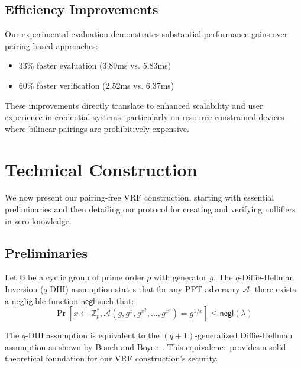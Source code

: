 \subsection{Efficiency Improvements}

Our experimental evaluation demonstrates substantial performance gains over pairing-based approaches:
\begin{itemize}
    \item 33\% faster evaluation (3.89ms vs. 5.83ms)
    \item 60\% faster verification (2.52ms vs. 6.37ms)
\end{itemize}

These improvements directly translate to enhanced scalability and user experience in credential systems, particularly on resource-constrained devices where bilinear pairings are prohibitively expensive.












\newpage
\section{Technical Construction}

We now present our pairing-free VRF construction, starting with essential preliminaries and then detailing our protocol for creating and verifying nullifiers in zero-knowledge.

\subsection{Preliminaries}

\begin{definition}
Let $\mathbb{G}$ be a cyclic group of prime order $p$ with generator $g$. The $q$-Diffie-Hellman Inversion ($q$-DHI) assumption states that for any PPT adversary $\mathcal{A}$, there exists a negligible function $\mathsf{negl}$ such that:
\[
\Pr\left[x \leftarrow \mathbb{Z}_p^*, \mathcal{A}(g, g^x, g^{x^2}, \ldots, g^{x^q}) = g^{1/x}\right] \leq \mathsf{negl}(\lambda)
\]
\end{definition}

\begin{remark}
The $q$-DHI assumption is equivalent to the $(q+1)$-generalized Diffie-Hellman assumption as shown by Boneh and Boyen \cite{BB04}. This equivalence provides a solid theoretical foundation for our VRF construction's security.
\end{remark}

